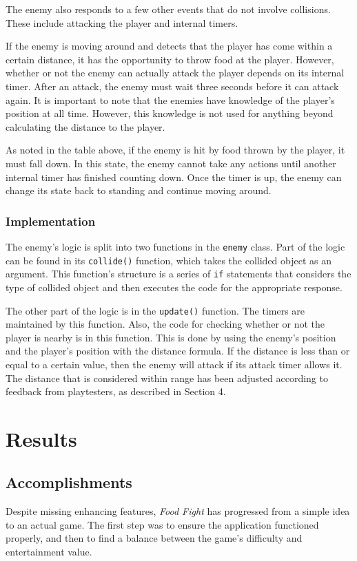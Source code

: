 \documentclass{article}
\begin{document}
The enemy also responds to a few other events that do not involve collisions. These include attacking the player and internal timers.

If the enemy is moving around and detects that the player has come within a certain distance, it has the opportunity to throw food at the player. However, whether or not the enemy can actually attack the player depends on its internal timer. After an attack, the enemy must wait three seconds before it can attack again. It is important to note that the enemies have knowledge of the player's position at all time. However, this knowledge is not used for anything beyond calculating the distance to the player.
 
As noted in the table above, if the enemy is hit by food thrown by the player, it must fall down. In this state, the enemy cannot take any actions until another internal timer has finished counting down. Once the timer is up, the enemy can change its state back to standing and continue moving around.

\subsubsection{Implementation}
The enemy's logic is split into two functions in the \verb+enemy+ class. Part of the logic can be found in its \verb+collide()+ function, which takes the collided object as an argument. This function's structure is a series of \verb+if+ statements that considers the type of collided object and then executes the code for the appropriate response.

The other part of the logic is in the \verb+update()+ function. The timers are maintained by this function. Also, the code for checking whether or not the player is nearby is in this function. This is done by using the enemy's position and the player's position with the distance formula. If the distance is less than or equal to a certain value, then the enemy will attack if its attack timer allows it. The distance that is considered within range has been adjusted according to feedback from playtesters, as described in Section 4.

\section{Results}

\subsection{Accomplishments}
Despite missing enhancing features, \textit{Food Fight} has progressed from a simple idea to an actual game. The first step was to ensure the application functioned properly, and then to find a balance between the game's difficulty and entertainment value.
\end{document}
